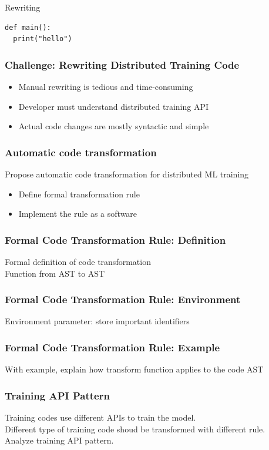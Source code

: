 \documentclass{beamer}
\begin{document}
\begin{frame}[fragile]{Rewriting}
\begin{verbatim}
def main():
  print("hello") 
\end{verbatim}
\end{frame}


\begin{frame}
  \frametitle{Challenge: Rewriting Distributed Training Code}
  \begin{itemize}
    \item Manual rewriting is tedious and time-consuming
    \item Developer must understand distributed training API
    \item Actual code changes are mostly syntactic and simple
  \end{itemize}
\end{frame}


\begin{frame}
  \frametitle{Automatic code transformation}
  Propose automatic code transformation for distributed ML training
  \begin{itemize}
    \item Define formal transformation rule
    \item Implement the rule as a software
  \end{itemize}
\end{frame}


\begin{frame}
  \frametitle{Formal Code Transformation Rule: Definition}
  Formal definition of code transformation\\
  Function from AST to AST  
\end{frame}


\begin{frame}
  \frametitle{Formal Code Transformation Rule: Environment}
  Environment parameter: store important identifiers
\end{frame}


\begin{frame}
  \frametitle{Formal Code Transformation Rule: Example}
  With example, explain how transform function applies to the code AST
\end{frame}


\begin{frame}
  \frametitle{Training API Pattern}
  Training codes use different APIs to train the model.\\
  Different type of training code shoud be transformed with different rule.\\
  Analyze training API pattern.
\end{frame}
\end{document}
